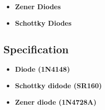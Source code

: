 \begin{itemize}
\begin{figure}[h]
\begin{subfigure}[h]{0.45\textwidth}
                        \caption{V-I Graph of Zener diodes}
                        \label{z_diode_vi}
                    \end{subfigure}
                \end{figure}
                \FloatBarrier
                Diodes are widely used in electronic devices for tasks like rectification, circuit protection, and signal modulation.
                
            \item \textbf{Zener Diodes}\par
                
            \item \textbf{Schottky Diodes}\par
                
        \end{itemize}
    \subsection{Specification}
        \begin{itemize}
            \item \textbf{Diode (1N4148)}
            
            \item \textbf{Schottky didode (SR160)}
            
            \item \textbf{Zener diode (1N4728A)}
            
        \end{itemize}
    
\newpage
